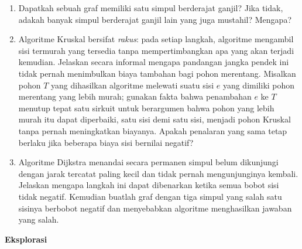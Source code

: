 \begin{enumerate}[start=15]
\item Dapatkah sebuah graf memiliki satu simpul berderajat ganjil?  Jika tidak, adakah banyak simpul berderajat ganjil lain yang juga mustahil?  Mengapa?\\

\item \label{ex:mst-greedy}Algoritme Kruskal bersifat \emph{rakus}: pada setiap langkah, algoritme mengambil sisi termurah yang tersedia tanpa mempertimbangkan apa yang akan terjadi kemudian.  Jelaskan secara informal mengapa pandangan jangka pendek ini tidak pernah menimbulkan biaya tambahan bagi pohon merentang.  Misalkan pohon $T$ yang dihasilkan algoritme melewati suatu sisi $e$ yang dimiliki pohon merentang yang lebih murah; gunakan fakta bahwa penambahan $e$ ke $T$ menutup tepat satu sirkuit untuk berargumen bahwa pohon yang lebih murah itu dapat diperbaiki, satu sisi demi satu sisi, menjadi pohon Kruskal tanpa pernah meningkatkan biayanya.  Apakah penalaran yang sama tetap berlaku jika beberapa biaya sisi bernilai negatif?
\exrefs{\S\ref{subsec:gt-kruskal}}

\item \label{ex:dijkstra-nonneg}Algoritme Dijkstra menandai secara permanen simpul belum dikunjungi dengan jarak tercatat paling kecil dan tidak pernah mengunjunginya kembali.  Jelaskan mengapa langkah ini dapat dibenarkan ketika semua bobot sisi tidak negatif.  Kemudian buatlah graf dengan tiga simpul yang salah satu sisinya berbobot negatif dan menyebabkan algoritme menghasilkan jawaban yang salah.
\exrefs{\S\ref{sec:gt-shortest-path}}

\end{enumerate}

\noindent \textbf{Eksplorasi}


